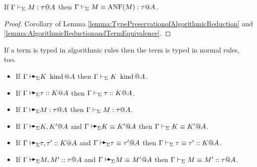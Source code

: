 \begin{corollary}
    \label{corollary:ANFandTermEquivalence}
    If \( \Gamma \vdash_\Sigma M : \tau @ A \) then \( \Gamma \vdash_\Sigma M \equiv \text{ANF}(M) : \tau @ A\).
\end{corollary}
\begin{proof}
    Corollary of Lemma \ref{lemma:TypePreservationofAlgorithmicReduction} and
    \ref{lemma:AlgorithmicReductionandTermEquivalence}.
\end{proof}

\begin{theorem}
    If a term is typed in algorithmic rules then the term is typed in normal rules, too.
    \begin{itemize}
        \item If \(\G\AVS K \iskind @ A \) then \(\Gamma\vdash_\Sigma K \operatorname{\ kind} @A \).
        \item If \(\G\AVS \tau :: K @ A \) then \(\Gamma\vdash_\Sigma \tau ::K  @ A \).
        \item If \(\G\AVS M:\tau @ A \) then \(\Gamma\vdash_\Sigma M:\tau @ A \).
        \item If \(\G\AVS K,K' @ A\) and \(\G\AVS K\E K' @ A \) then \(\Gamma\vdash_\Sigma K\equiv K' @ A \).
        \item If \(\G\AVS \tau,\tau' :: K @ A \) and \(\G\AVS \tau \E \tau' @ A \) then \(\Gamma\vdash_\Sigma \tau \equiv \tau' :: K @ A \).
        \item If \(\G\AVS M,M' :: \tau @ A \) and \(\G\AVS M\E M' @ A \) then \(\Gamma\vdash_\Sigma M\equiv M' :: \tau @ A \).
    \end{itemize}
\end{theorem}

